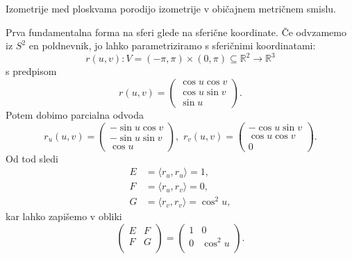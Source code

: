 \begin{opomba}
 Izometrije med ploskvama porodijo izometrije v običajnem metričnem
 smislu.
\end{opomba}

\begin{primer}
 Prva fundamentalna forma na sferi glede na sferične koordinate. Če
 odvzamemo iz $S^2$ en poldnevnik, jo lahko parametriziramo s
 sferičnimi koordinatami: 
 \begin{equation*} r(u,v): V = \left( -\pi, \pi \right) \times \left(
 0, \pi  \right) \subseteq  \mathbb{R}^2 \to  \mathbb{R}^3
  \end{equation*} s predpisom \begin{equation*} r(u,v) = 
\begin{pmatrix}\cos u \cos v \\ \cos u \sin v \\ \sin u
\end{pmatrix}.\end{equation*}
Potem dobimo parcialna odvoda 
\begin{equation*}   r_u(u,v) = \begin{pmatrix}-\sin u \cos v \\ -\sin u \sin v \\ \cos u
\end{pmatrix}, \,\,  r_v(u,v) = 
\begin{pmatrix}-\cos u \sin  v \\ \cos u \cos v \\ 0
\end{pmatrix}.\end{equation*}
Od tod sledi 
\begin{align*}
    E &= \langle r_u, r_u \rangle = 1, \\
    F &= \langle r_u, r_v \rangle = 0, \\
	G &= \langle r_v, r_v \rangle = \cos^2 u,
\end{align*} kar lahko zapišemo v obliki 
\begin{equation*} 
\begin{pmatrix}
	E & F \\
	F & G \\
\end{pmatrix}
=
\begin{pmatrix}
	1 & 0 \\
	0 & \cos^2 u \\
\end{pmatrix}
.
\end{equation*}
\end{primer}

